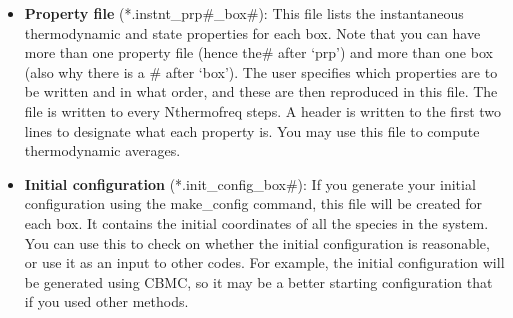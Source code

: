 \begin{itemize}
\item{{\bf Property file}} (*.instnt\_prp\#\_box\#): This file lists the instantaneous thermodynamic and state properties for each box. Note that you can have more than one property file (hence the\# after `prp') and more than one box (also why there is a \# after `box'). The user specifies which properties are to be written and in what order, and these are then reproduced in this file. The file is written to every Nthermofreq steps. A header is written to the first two lines to designate what each property is. You may use this file to compute thermodynamic averages.

\item {\bf Initial configuration} (*.init\_config\_box\#): If you generate your initial configuration using the make\_config command, this file will be created for each box. It contains the initial coordinates of all the species in the system. You can use this to check on whether the initial configuration is reasonable, or use it as an input to other codes. For example, the initial configuration will be generated using CBMC, so it may be a better starting configuration that if you used other methods. 

\end{itemize}
